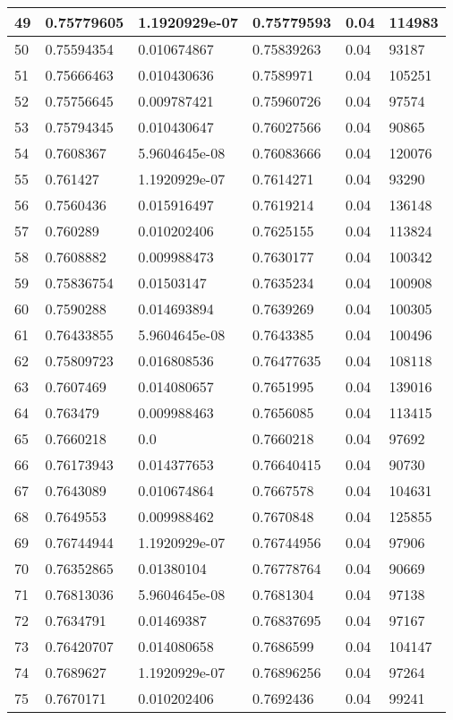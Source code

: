 \begin{longtable}{|l|l|l|l|l|l|}
49 & 0.75779605 & 1.1920929e-07 & 0.75779593 & 0.04 & 114983 \\ \hline 
50 & 0.75594354 & 0.010674867 & 0.75839263 & 0.04 & 93187 \\ \hline 
51 & 0.75666463 & 0.010430636 & 0.7589971 & 0.04 & 105251 \\ \hline 
52 & 0.75756645 & 0.009787421 & 0.75960726 & 0.04 & 97574 \\ \hline 
53 & 0.75794345 & 0.010430647 & 0.76027566 & 0.04 & 90865 \\ \hline 
54 & 0.7608367 & 5.9604645e-08 & 0.76083666 & 0.04 & 120076 \\ \hline 
55 & 0.761427 & 1.1920929e-07 & 0.7614271 & 0.04 & 93290 \\ \hline 
56 & 0.7560436 & 0.015916497 & 0.7619214 & 0.04 & 136148 \\ \hline 
57 & 0.760289 & 0.010202406 & 0.7625155 & 0.04 & 113824 \\ \hline 
58 & 0.7608882 & 0.009988473 & 0.7630177 & 0.04 & 100342 \\ \hline 
59 & 0.75836754 & 0.01503147 & 0.7635234 & 0.04 & 100908 \\ \hline 
60 & 0.7590288 & 0.014693894 & 0.7639269 & 0.04 & 100305 \\ \hline 
61 & 0.76433855 & 5.9604645e-08 & 0.7643385 & 0.04 & 100496 \\ \hline 
62 & 0.75809723 & 0.016808536 & 0.76477635 & 0.04 & 108118 \\ \hline 
63 & 0.7607469 & 0.014080657 & 0.7651995 & 0.04 & 139016 \\ \hline 
64 & 0.763479 & 0.009988463 & 0.7656085 & 0.04 & 113415 \\ \hline 
65 & 0.7660218 & 0.0 & 0.7660218 & 0.04 & 97692 \\ \hline 
66 & 0.76173943 & 0.014377653 & 0.76640415 & 0.04 & 90730 \\ \hline 
67 & 0.7643089 & 0.010674864 & 0.7667578 & 0.04 & 104631 \\ \hline 
68 & 0.7649553 & 0.009988462 & 0.7670848 & 0.04 & 125855 \\ \hline 
69 & 0.76744944 & 1.1920929e-07 & 0.76744956 & 0.04 & 97906 \\ \hline 
70 & 0.76352865 & 0.01380104 & 0.76778764 & 0.04 & 90669 \\ \hline 
71 & 0.76813036 & 5.9604645e-08 & 0.7681304 & 0.04 & 97138 \\ \hline 
72 & 0.7634791 & 0.01469387 & 0.76837695 & 0.04 & 97167 \\ \hline 
73 & 0.76420707 & 0.014080658 & 0.7686599 & 0.04 & 104147 \\ \hline 
74 & 0.7689627 & 1.1920929e-07 & 0.76896256 & 0.04 & 97264 \\ \hline 
75 & 0.7670171 & 0.010202406 & 0.7692436 & 0.04 & 99241 \\ \hline 
\end{longtable}